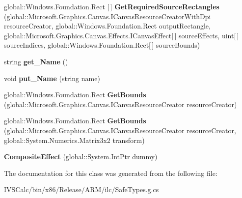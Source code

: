 \begin{DoxyCompactItemize}
\item 
\mbox{\label{class_microsoft_1_1_graphics_1_1_canvas_1_1_effects_1_1_composite_effect_a5a5b1c61ef98400c1c3341a3735b986e}} 
global\+::\+Windows.\+Foundation.\+Rect \mbox{[}$\,$\mbox{]} {\bfseries Get\+Required\+Source\+Rectangles} (global\+::\+Microsoft.\+Graphics.\+Canvas.\+I\+Canvas\+Resource\+Creator\+With\+Dpi resource\+Creator, global\+::\+Windows.\+Foundation.\+Rect output\+Rectangle, global\+::\+Microsoft.\+Graphics.\+Canvas.\+Effects.\+I\+Canvas\+Effect\mbox{[}$\,$\mbox{]} source\+Effects, uint\mbox{[}$\,$\mbox{]} source\+Indices, global\+::\+Windows.\+Foundation.\+Rect\mbox{[}$\,$\mbox{]} source\+Bounds)
\item 
\mbox{\label{class_microsoft_1_1_graphics_1_1_canvas_1_1_effects_1_1_composite_effect_a63d03ebf847fd4f46315ca9f1773c46d}} 
string {\bfseries get\+\_\+\+Name} ()
\item 
\mbox{\label{class_microsoft_1_1_graphics_1_1_canvas_1_1_effects_1_1_composite_effect_abd53f3406b6ae816b17d0aeee7119e44}} 
void {\bfseries put\+\_\+\+Name} (string name)
\item 
\mbox{\label{class_microsoft_1_1_graphics_1_1_canvas_1_1_effects_1_1_composite_effect_a991680e8a31e88420dd24001b74e229e}} 
global\+::\+Windows.\+Foundation.\+Rect {\bfseries Get\+Bounds} (global\+::\+Microsoft.\+Graphics.\+Canvas.\+I\+Canvas\+Resource\+Creator resource\+Creator)
\item 
\mbox{\label{class_microsoft_1_1_graphics_1_1_canvas_1_1_effects_1_1_composite_effect_a403028b263af314b1162888a2320783e}} 
global\+::\+Windows.\+Foundation.\+Rect {\bfseries Get\+Bounds} (global\+::\+Microsoft.\+Graphics.\+Canvas.\+I\+Canvas\+Resource\+Creator resource\+Creator, global\+::\+System.\+Numerics.\+Matrix3x2 transform)
\item 
\mbox{\label{class_microsoft_1_1_graphics_1_1_canvas_1_1_effects_1_1_composite_effect_a32c62338e5b874000e491bacc0e032c1}} 
{\bfseries Composite\+Effect} (global\+::\+System.\+Int\+Ptr dummy)
\end{DoxyCompactItemize}


The documentation for this class was generated from the following file\+:\begin{DoxyCompactItemize}
\item 
I\+V\+S\+Calc/bin/x86/\+Release/\+A\+R\+M/ilc/Safe\+Types.\+g.\+cs\end{DoxyCompactItemize}
